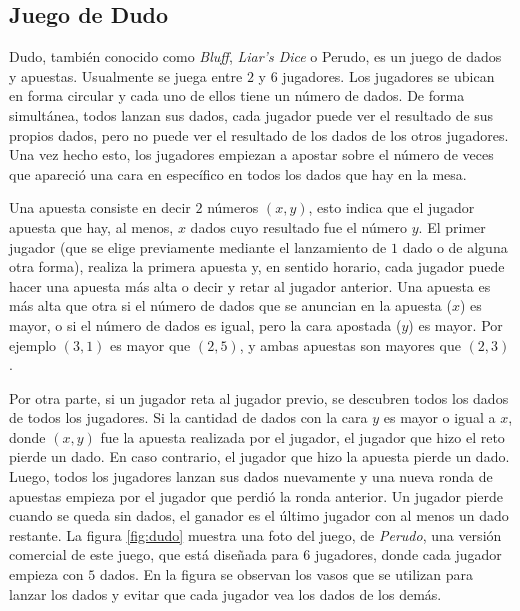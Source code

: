 \subsection*{Juego de Dudo}
Dudo, también conocido como \textit{Bluff}, \textit{Liar's Dice} o Perudo, es un juego de dados y apuestas. Usualmente se juega entre $2$ y $6$ jugadores. Los jugadores se ubican en forma circular y cada uno de ellos tiene un número de dados. De forma simultánea, todos lanzan sus dados, cada jugador puede ver el resultado de sus propios dados, pero no puede ver el resultado de los dados de los otros jugadores. Una vez hecho esto, los jugadores empiezan a apostar sobre el número de veces que apareció una cara en específico en todos los dados que hay en la mesa.

Una apuesta consiste en decir $2$ números $(x, y)$, esto indica que el jugador apuesta que hay, al menos, $x$ dados cuyo resultado fue el número $y$. El primer jugador (que se elige previamente mediante el lanzamiento de $1$ dado o de alguna otra forma), realiza la primera apuesta y, en sentido horario, cada jugador puede hacer una apuesta más alta o decir  y retar al jugador anterior. Una apuesta es más alta que otra si el número de dados que se anuncian en la apuesta ($x$) es mayor, o si el número de dados es igual, pero la cara apostada ($y$) es mayor. Por ejemplo $(3, 1)$ es mayor que $(2, 5)$, y ambas apuestas son mayores que $(2, 3)$.

Por otra parte, si un jugador reta al jugador previo, se descubren todos los dados de todos los jugadores. Si la cantidad de dados con la cara $y$ es mayor o igual a $x$, donde $(x, y)$ fue la apuesta realizada por el jugador, el jugador que hizo el reto pierde un dado. En caso contrario, el jugador que hizo la apuesta pierde un dado. Luego, todos los jugadores lanzan sus dados nuevamente y una nueva ronda de apuestas empieza por el jugador que perdió la ronda anterior. Un jugador pierde cuando se queda sin dados, el ganador es el último jugador con al menos un dado restante. La figura \ref{fig:dudo} muestra una foto del juego, de \textit{Perudo}, una versión comercial de este juego, que está diseñada para $6$ jugadores, donde cada jugador empieza con $5$ dados. En la figura se observan los vasos que se utilizan para lanzar los dados y evitar que cada jugador vea los dados de los demás.

